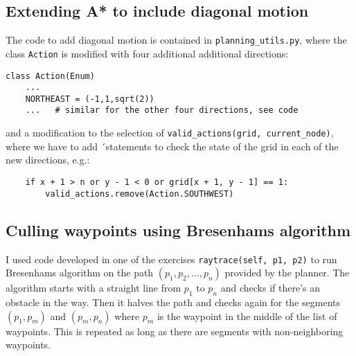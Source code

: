 \documentclass[12pt]{article}
\begin{document}
\subsection{Extending A* to include diagonal motion}

The code to add diagonal motion is contained in \verb+planning_utils.py+, where the class \verb+Action+ is modified with four additional
additional directions:

\begin{verbatim}
class Action(Enum)
    ...
    NORTHEAST = (-1,1,sqrt(2))
    ...   # similar for the other four directions, see code
\end{verbatim}

and  a modification to the selection of \verb+valid_actions(grid, current_node)+, where we have to add ´statements to
check the state of the grid in each of the new directions, e.g.:

\begin{verbatim}
    if x + 1 > n or y - 1 < 0 or grid[x + 1, y - 1] == 1:
        valid_actions.remove(Action.SOUTHWEST)
\end{verbatim}

\subsection{Culling waypoints using Bresenhams algorithm}

I used code developed in one of the exercises \verb+raytrace(self, p1, p2)+ to run Bresenhams algorithm on the path $(p_1,p_2,\dots,p_n)$ provided by the planner. The algorithm starts with a straight line from $p_1$ to $p_n$ and checks if there's an obstacle in the way. Then it halves the path and checks again for the segments $(p_1, p_m)$ and $(p_m,p_n)$ where $p_m$ is the waypoint in the middle of the list of waypoints. This is repeated as long as there are segments with non-neighboring waypoints.
\end{document}

